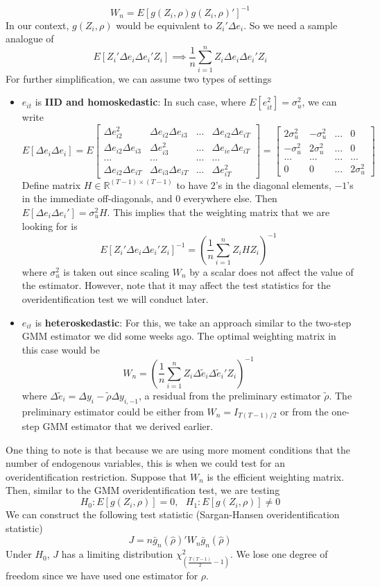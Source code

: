 \documentclass[12pt]{article}
\theoremstyle{definition}
\theoremstyle{property}
\theoremstyle{assumption}
\theoremstyle{example}
\theoremstyle{comment}
\begin{document}
\[
W_n = E[g(Z_i,\rho)g(Z_i,\rho)']^{-1}
\]
In our context, $g(Z_i,\rho)$ would be equivalent to $Z_i'\Delta e_i$. So we need a sample analogue of
\[
E[Z_i'\Delta {e}_i \Delta {e}_i'Z_i] \implies \frac{1}{n}\sum_{i=1}^nZ_i\Delta {e}_i \Delta {e}_i' Z_i
\]
For further simplification, we can assume two types of settings
\begin{itemize}
\item $e_{it}$ is \textbf{IID and homoskedastic}: In such case, where $E[e_{it}^2]=\sigma_u^2$,  we can write
\[
E[\Delta {e}_i \Delta {e}_i]=E\begin{bmatrix}\Delta e_{i2}^2 & \Delta e_{i2}\Delta e_{i3} & ... & \Delta e_{i2}\Delta e_{iT} \\\Delta e_{i2}\Delta e_{i3} & \Delta e_{i3}^2 & ... & \Delta e_{ie}\Delta e_{iT}\\ ... & ...  & ... & ... \\  \Delta e_{i2}\Delta e_{iT} & \Delta e_{i3}\Delta e_{iT} & ... & \Delta e_{iT}^2  \end{bmatrix}=\begin{bmatrix}2\sigma_u^2& -\sigma_u^2 &... &0\\ -\sigma_u^2 & 2\sigma_u^2 & ... &0 \\ ...&...&...&...\\ 0 & 0 & ... & 2\sigma_u^2\end{bmatrix}
\]
Define matrix $H\in\mathbb{R}^{(T-1)\times(T-1)}$ to have $2$'s in the diagonal elements, $-1$'s in the immediate off-diagonals, and $0$ everywhere else. Then $E[\Delta {e}_i \Delta {e}_i']=\sigma_u^2 H$. This implies that the weighting matrix that we are looking for is
\[
E[Z_i'\Delta {e}_i \Delta {e}_i'Z_i]^{-1}=\left(\frac{1}{n}\sum_{i=1}^nZ_iH Z_i\right)^{-1}
\]
where $\sigma_u^2$ is taken out since scaling $W_n$ by a scalar does not affect the value of the estimator. However, note that it may affect the test statistics for the overidentification test we will conduct later. 
\item $e_{it}$ is \textbf{heteroskedastic}: For this, we take an approach similar to the two-step GMM estimator we did some weeks ago. The optimal weighting matrix in this case would be
\[
W_n=\left(\frac{1}{n}\sum_{i=1}^nZ_i\Delta\tilde{{e}}_i \Delta\tilde{{e}}_i' Z_i\right)^{-1} 
\]
where $\Delta\tilde{{e}}_i=\Delta {y}_ i -\tilde{\rho}\Delta {y}_{i,-1}$, a residual from the preliminary estimator $\tilde{\rho}$. The preliminary estimator could be either from $W_n = I_{T(T-1)/2}$ or from the one-step GMM estimator that we derived earlier. 
\end{itemize}
\par
One thing to note is that because we are using more moment conditions that the number of endogenous variables, this is when we could test for an overidentification restriction. Suppose that $W_n$ is the efficient weighting matrix. Then, similar to the GMM overidentification test, we are testing
\[
H_0: E[g(Z_i,\rho)]=0, \ \ \ H_1: E[g(Z_i,\rho)]\neq0
\]
We can construct the following test statistic (Sargan-Hansen overidentification statistic)
\[
J= n \bar{g}_n(\hat{\rho})'W_n\bar{g}_n(\hat{\rho})
\]
Under $H_0$, $J$ has a limiting distribution $\chi^2_{\left(\frac{T(T-1)}{2}-1\right)}$. We lose one degree of freedom since we have used one estimator for $\rho$. 

\end{document}
